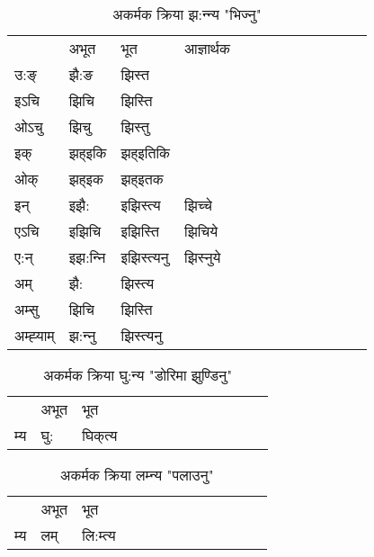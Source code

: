 \begin{table}[H]
\centering
\caption{\label{it.vi} अकर्मक क्रिया  झ:न्‍न्य  "भिज्नु"  }
\begin{tabular}{l|l|l|l|l|l|l|l|l|l|l|l|l}  \toprule
&अभूत & भूत & आज्ञार्थक \\ 
उ:ङ्‌ &झै:ङ &झिस्त \\ 
इऽचि &झिचि &झिस्ति   \\ 
ओऽचु &झिचु &झिस्तु   \\ 
इक् &झह्इकि &झह्इतिकि   \\ 
ओक् &झह्इक &झह्इतक   \\ 
इन् & इझै: & इझिस्त्य &झिच्‍चे  \\ 
एऽचि & इझिचि & इझिस्ति &झिचिये    \\ 
ए:न् & इझ:न्‍नि  & इझिस्त्यनु &झिस्‍नुये  \\ 
अम् & झै: & झिस्त्य   \\ 
अम्सु & झिचि & झिस्ति   \\ 
अम्ह्‍याम् & झ:न्‍नु  & झिस्त्यनु \\ 
\bottomrule
\end{tabular}
\end{table}


\begin{table}[H]
\centering
\caption{\label{ik.vi} अकर्मक क्रिया  घु:न्य  "डोरिमा झुण्डिनु"  }
\begin{tabular}{l|l|l|l|l|l|l|l|l|l|l|l|l}  \toprule
&अभूत & भूत   \\ 
म्य & घु: & घिक्‌त्य   \\ 
\bottomrule
\end{tabular}
\end{table}


\begin{table}[H]
\centering
\caption{\label{im.vi} अकर्मक क्रिया  लम्‍न्य  "पलाउनु"  }
\begin{tabular}{l|l|l|l|l|l|l|l|l|l|l|l|l}  \toprule
&अभूत & भूत   \\ 
म्य & लम् & लि:म्त्य   \\ 
\bottomrule
\end{tabular}
\end{table}


